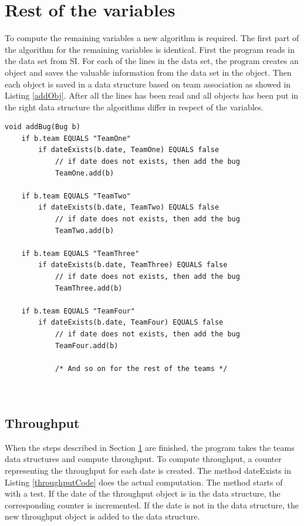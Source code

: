 \documentclass[UKenglish]{ifimaster}  %
\begin{document}
 \section{Rest of the variables}
 \label{sec:rotv}
To compute the remaining variables a new algorithm is required.  The first part of the algorithm for the remaining variables is identical. First the program reads in the data set from SI. For each of the lines in the data set, the program creates an object and saves the valuable information from the data set in the object. Then each object is saved in a data structure based on team association as showed in Listing \ref{addObj}.  After all the lines has been read and all objects has been put in the right data structure the algorithms differ in respect of the variables.
 \begin{lstlisting}[caption=Pseudocode example of how throughput objects are added, label=addObj]
void addBug(Bug b)
	if b.team EQUALS "TeamOne"
		if dateExists(b.date, TeamOne) EQUALS false
			// if date does not exists, then add the bug
			TeamOne.add(b)
			
	if b.team EQUALS "TeamTwo"
		if dateExists(b.date, TeamTwo) EQUALS false
			// if date does not exists, then add the bug
			TeamTwo.add(b)
			
	if b.team EQUALS "TeamThree"
		if dateExists(b.date, TeamThree) EQUALS false 
			// if date does not exists, then add the bug
			TeamThree.add(b)
			
	if b.team EQUALS "TeamFour"
		if dateExists(b.date, TeamFour) EQUALS false
			// if date does not exists, then add the bug
			TeamFour.add(b)
			
			/* And so on for the rest of the teams */
		
	
 \end{lstlisting}
 
%	
 
\subsection{Throughput}
 \label{sec:TP}
When the steps described in Section \ref{sec:rotv} are finished, the program takes the teams data structures and compute throughput. To compute throughput, a counter representing the throughput for each date is created. The method dateExists in Listing \ref{throughputCode} does the actual computation. The method starts of with a test. If the date of the throughput object is in the data structure, the corresponding counter is incremented.  If the date is not in the data structure, the new throughput object is added to the data structure.
 
\end{document}
